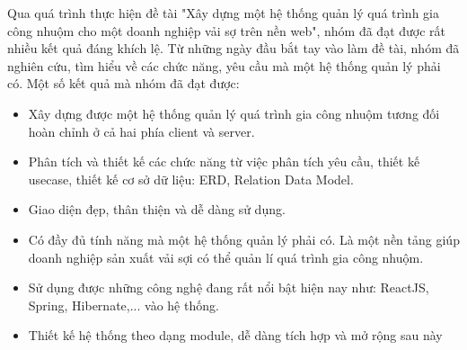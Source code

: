 Qua quá trình thực hiện đề tài "Xây dựng một hệ thống quản lý quá trình gia công nhuộm cho một doanh nghiệp vải sợ trên nền web", nhóm đã đạt được rất nhiều kết quả đáng khích lệ. Từ những ngày đầu bắt tay vào làm đề tài, nhóm đã nghiên cứu, tìm hiểu về các chức năng, yêu cầu mà một hệ thống quản lý phải có. Một số kết quả mà nhóm đã đạt được:

\begin{itemize}
    \item Xây dựng được một hệ thống quản lý quá trình gia công nhuộm tương đối hoàn chỉnh ở cả hai phía client và server.
    \item Phân tích và thiết kế các chức năng từ việc phân tích yêu cầu, thiết kế usecase, thiết kế cơ sở dữ liệu: ERD, Relation Data Model.
    \item Giao diện đẹp, thân thiện và dễ dàng sử dụng.
    \item Có đầy đủ tính năng mà một hệ thống  quản lý phải có. Là một nền tảng giúp doanh nghiệp sản xuất vải sợi có thể quản lí quá trình gia công nhuộm.
    \item Sử dụng được những công nghệ đang rất nổi bật hiện nay như: ReactJS, Spring, Hibernate,... vào hệ thống.
    \item Thiết kế hệ thống theo dạng module, dễ dàng tích hợp và mở rộng sau này
\end{itemize}